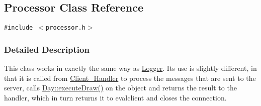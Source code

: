\hypertarget{classProcessor}{
\subsection{Processor Class Reference}
\label{classProcessor}
}
{\tt \#include $<$processor.h$>$}



\subsubsection{Detailed Description}
This class works in exactly the same way as \hyperlink{classLogger}{Logger}. Its use is slightly different, in that it is called from \hyperlink{classClient__Handler}{Client\_\-Handler} to process the messages that are sent to the server, calls \hyperlink{classDay_Daya8}{Day::execute\-Draw()} on the object and returns the result to the handler, which in turn returns it to evalclient and closes the connection. 



